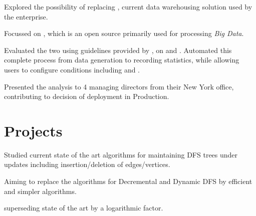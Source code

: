 \documentclass[a4paper]{norm-resume}
\begin{document}
  
\begin{tightitemize}
        \small
        {
        \item Explored the possibility of  replacing , current data warehousing solution used by the enterprise.
        \item Focussed on , which is an open source  primarily used for processing \textit{Big Data}.
        \item Evaluated the two using guidelines provided by , on  and . Automated this complete process from data generation to recording statistics, while allowing users to configure conditions including  and .
        \item Presented the analysis to 4 managing directors from their New York office, contributing to decision of deployment in Production.
        }
\end{tightitemize}

\vspace{3mm} %


\section{Projects \hrulefill}

\vspace{2mm}

                
\begin{tightitemize}
        \small{
        \item Studied current state of the art algorithms for maintaining DFS trees under updates including insertion/deletion of edges/vertices.
        \item Aiming to replace the algorithms for Decremental and Dynamic DFS by efficient and simpler algorithms.
        \item {} superseding state of the art by a logarithmic factor.
        }
\end{tightitemize}
\end{document}

